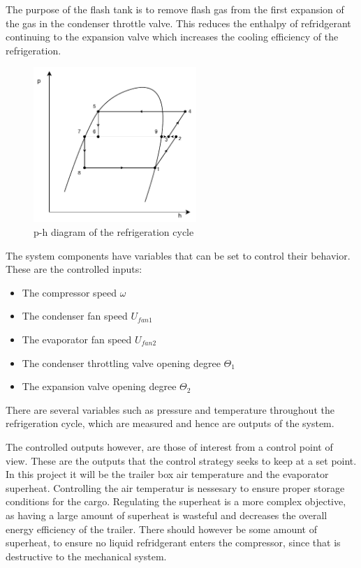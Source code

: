 The purpose of the flash tank is to remove flash gas from the first expansion of the gas in the condenser throttle valve. This reduces the enthalpy of refridgerant continuing to the expansion valve which increases the cooling efficiency of the refrigeration.\\

\begin{figure}[h!]
	\centering
	\includegraphics[width=0.55\textwidth]{Graphics/Flash_Tank_P-h_Diagram}
	\caption{p-h diagram of the refrigeration cycle}
	\label{fig:p-h_diagram}
\end{figure}


The system components have variables that can be set to control their behavior. These are the controlled inputs:

\begin{itemize}
	\item The compressor speed $ \omega $
	\item The condenser fan speed $ U_{fan1} $
	\item The evaporator fan speed  $ U_{fan2} $
	\item The condenser throttling valve opening degree $ \Theta_1 $
	\item The expansion valve opening degree $ \Theta_2 $
\end{itemize}

There are several variables such as pressure and temperature throughout the refrigeration cycle, which are measured and hence are outputs of the system. 

The controlled outputs however, are those of interest from a control point of view. These are the outputs that the control strategy seeks to keep at a set point. In this project it will be the trailer box air temperature and the evaporator superheat. Controlling the air temperatur is nessesary to ensure proper storage conditions for the cargo. Regulating the superheat is a more complex objective, as having a large amount of superheat is wasteful and decreases the overall energy efficiency of the trailer. There should however be some amount of superheat, to ensure no liquid refridgerant enters the compressor, since that is destructive to the mechanical system.\\

